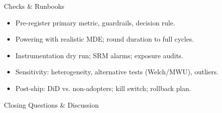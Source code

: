 \documentclass[aspectratio=169]{beamer}
\begin{document}
\begin{frame}{Checks \& Runbooks}
\small
\begin{itemize}
  \item Pre-register primary metric, guardrails, decision rule.
  \item Powering with realistic MDE; round duration to full cycles.
  \item Instrumentation dry run; SRM alarms; exposure audits.
  \item Sensitivity: heterogeneity, alternative tests (Welch/MWU), outliers.
  \item Post-ship: DiD vs. non-adopters; kill switch; rollback plan.
\end{itemize}
\end{frame}

\begin{frame}{Closing}
  \centering
  \Large Questions \& Discussion
\end{frame}
\end{document}
